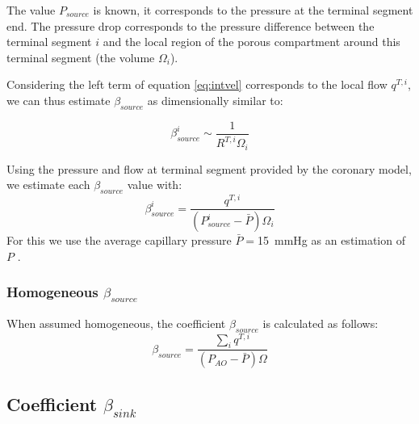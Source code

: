 \documentclass[a4paper, 11pt]{article} %
\begin{document}
The value $P_{source}$ is known, it corresponds to the pressure at the terminal segment end. The pressure drop corresponds to the pressure difference between the terminal segment $i$ and the local region of the porous compartment around this terminal segment (the volume $\Omega_i$).

Considering the left term of equation \ref{eq:intvel} corresponds to the local flow $q^{T,i}$, we can thus estimate $\beta_{source}$ as dimensionally similar to:

\begin{equation}
\beta_{source}^i \sim \frac{1}{R^{T,i} \Omega_i}
\label{eq:estim beta}
\end{equation}

Using the pressure and flow at terminal segment provided by the coronary model, we estimate each $\beta_{source}$ value with:
\begin{equation}
\beta_{source}^i = \frac{q^{T,i}}{(P_{source}^i - \bar{P})\Omega_i}
\end{equation}
For this we use the average capillary pressure $\bar{P} =$\SI{15}{\mmHg} as an estimation of $P$ \cite{chapelle2010poroelastic}.\\

\subsubsection*{Homogeneous $\beta_{source}$}

When assumed homogeneous, the coefficient $\beta_{source}$ is calculated as follows:
\begin{equation}
\beta_{source} = \frac{\sum_{i} q^{T,i}}{(P_{AO} - \bar{P}) \Omega}
\end{equation}

\subsection*{Coefficient $\beta_{sink}$}
\end{document}
